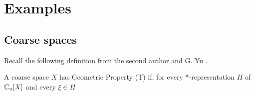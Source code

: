 \section{Examples}

\subsection{Coarse spaces}

Recall the following definition from the second author and G. Yu \cite{WillettYu}.

\begin{definition} A coarse space $X$ has Geometric Property (T) if, for every $*$-representation $H$ of $\mathbb C_u [X]$ and every $\xi \in H$
  
\end{definition}
